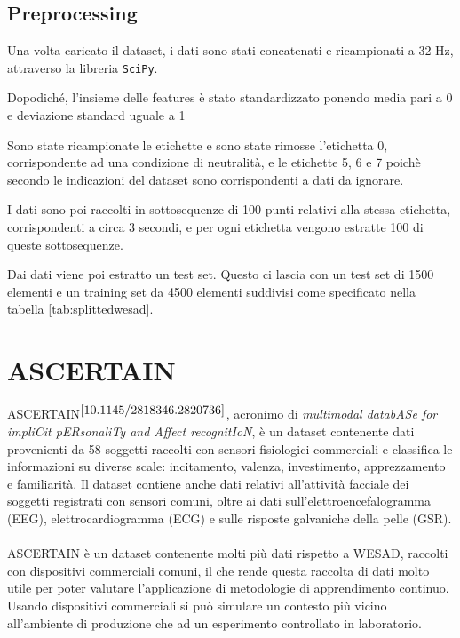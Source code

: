 \subsection{Preprocessing}
Una volta caricato il dataset, i dati sono stati concatenati e ricampionati a 32 Hz, attraverso la libreria \texttt{SciPy}.

Dopodiché, l'insieme delle features è stato standardizzato ponendo media pari a 0 e deviazione standard uguale a 1

Sono state ricampionate le etichette e sono state rimosse l'etichetta 0, corrispondente ad una condizione di neutralità, e le etichette 5, 6 e 7 poichè secondo le indicazioni del dataset sono corrispondenti a dati da ignorare.



I dati sono poi raccolti in sottosequenze di 100 punti relativi alla stessa etichetta, corrispondenti a circa 3 secondi, e per ogni etichetta vengono estratte 100 di queste sottosequenze.

Dai dati viene poi estratto un test set. Questo ci lascia con un test set di 1500 elementi e un training set da 4500 elementi suddivisi come specificato nella tabella \ref{tab:splittedwesad}.

\section{ASCERTAIN}
ASCERTAIN$^{\cite{10.1145/2818346.2820736}}$, acronimo di \textit{multimodal databASe for impliCit pERsonaliTy and Affect recognitIoN}, è un dataset contenente dati provenienti da 58 soggetti raccolti con sensori fisiologici commerciali e classifica le informazioni su diverse scale: incitamento, valenza, investimento, apprezzamento e familiarità. Il dataset contiene anche dati relativi all'attività facciale dei soggetti registrati con sensori comuni, oltre ai dati sull'elettroencefalogramma (EEG), elettrocardiogramma (ECG) e sulle risposte galvaniche della pelle (GSR).\\\\
ASCERTAIN è un dataset contenente molti più dati rispetto a WESAD, raccolti con dispositivi commerciali comuni, il che rende questa raccolta di dati molto utile per poter valutare l'applicazione di metodologie di apprendimento continuo. Usando dispositivi commerciali si può simulare un contesto più vicino all'ambiente di produzione che ad un esperimento controllato in laboratorio.
